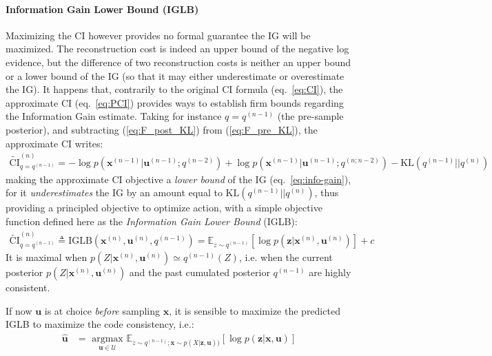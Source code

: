 \documentclass[12pt,twoside,openright]{article}
\begin{document}
\paragraph{Information Gain Lower Bound (IGLB)}
{\color{Purple} Maximizing the CI however provides no formal guarantee the IG will be maximized. The reconstruction cost is indeed an upper bound of the negative log evidence, but the difference of two reconstruction costs is neither an upper bound or a lower bound of the IG (so  that it may either underestimate or overestimate the IG). It happens that, contrarily to the original CI formula (eq.~\ref{eq:CI}), the approximate CI (eq.~\ref{eq:PCI}) provides ways to establish firm bounds regarding the Information Gain estimate.}
{\color{Purple}Taking for instance $q= q^{(n-1)}$ (the pre-sample posterior), and subtracting (\ref{eq:F_post_KL}) from (\ref{eq:F_pre_KL}), the approximate CI writes:}
\begin{align}
	\tilde{\text{CI}}^{(n)}_{q = q^{(n-1)}} = 
	-\log p(\boldsymbol{x}^{(n-1)}|\boldsymbol{u}^{(n-1)}; q^{(n-2)}) 
	+ \log p(\boldsymbol{x}^{(n-1)}|\boldsymbol{u}^{(n-1)}; q^{(n;n-2)}) - \text{KL} (q^{(n-1)}||q^{(n)})
\end{align}
making the approximate CI objective {\color{Purple}a \emph{lower bound} of the IG (eq.~\ref{eq:info-gain}), for it} \emph{underestimates} the IG by an amount equal to $\text{KL} (q^{(n-1)}||q^{(n)})$, thus providing a {\color{Purple} principled objective} to optimize action, with  a simple objective function defined here as the {\color{Purple}\emph{Information Gain Lower Bound} (IGLB)}:
\begin{align}
	\tilde{\text{CI}}^{(n)}_{q = q^{(n-1)}} 
	\triangleq \text{IGLB}(\boldsymbol{x}^{(n)}, \boldsymbol{u}^{(n)}, q^{(n-1)})
	= \mathbb{E}_{z\sim q^{(n-1)}} \left[\log p(\boldsymbol{z}|\boldsymbol{x}^{(n)}, \boldsymbol{u}^{(n)})\right] + c\label{eq:PCI-n-1}
\end{align}
It is maximal when $p(Z|\boldsymbol{x}^{(n)}, \boldsymbol{u}^{(n)})\simeq q^{(n-1)}(Z)$, i.e. when {\color{Purple} the current posterior} $p(Z|\boldsymbol{x}^{(n)}, \boldsymbol{u}^{(n)})$ and {\color{Purple} the past cumulated posterior} $q^{(n-1)}$ are highly consistent.

If now $\boldsymbol{u}$ is at choice \emph{before} sampling  $\boldsymbol{x}$, it is sensible to maximize the predicted {\color{Purple} IGLB} to maximize the code consistency, i.e.:
\begin{align}
	\hat{\boldsymbol{u}} 
	&= \underset{\boldsymbol{u} \in \mathcal{U}}{\text{ argmax }} \mathbb{E}_{z\sim q^{(n-1)}; \boldsymbol{x}\sim p(X|\boldsymbol{z},\boldsymbol{u}))} 
	\left[\log p(\boldsymbol{z}|\boldsymbol{x}, \boldsymbol{u})\right]\label{eq:LC-pred}
\end{align}
\end{document}
